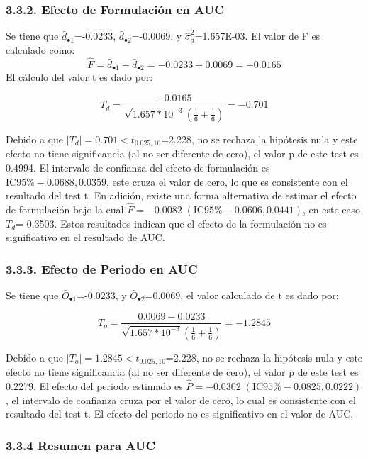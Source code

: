 \documentclass[]{article}
\begin{document}
\subsubsection{3.3.2. Efecto de Formulación en
AUC}\label{efecto-de-formulacion-en-auc}

Se tiene que \(\bar{d}_{\bullet1}\)=-0.0233,
\(\bar{d}_{\bullet2}\)=-0.0069, y \(\hat{\sigma}_{d}^{2}\)=1.657E-03. El
valor de F es calculado como:
\[\hat{F} = \bar{d}_{\bullet1} - \bar{d}_{\bullet2} = -0.0233 + 0.0069 = -0.0165\]
El cálculo del valor t es dado por:

\[T_{d}=\frac{-0.0165}{\sqrt{1.657*10^{-3}}\left(\frac{1}{6}+\frac{1}{6}\right)}=-0.701\]

Debido a que \(\left|T_{d}\right|=0.701<t_{0.025,10}\)=2.228, no se
rechaza la hipótesis nula y este efecto no tiene significancia (al no
ser diferente de cero), el valor p de este test es 0.4994. El intervalo
de confianza del efecto de formulación es
\(\textrm{IC95}\%-0.0688,0.0359\), este cruza el valor de cero, lo que
es consistente con el resultado del test t. En adición, existe una forma
alternativa de estimar el efecto de formulación bajo la cual
\(\hat{F}=-0.0082\;(\textrm{IC95}\%-0.0606,0.0441)\), en este caso
\(T_{d}\)=-0.3503. Estos resultados indican que el efecto de la
formulación no es significativo en el resultado de AUC.

\subsubsection{3.3.3. Efecto de Periodo en
AUC}\label{efecto-de-periodo-en-auc}

Se tiene que \(\bar{O}_{\bullet1}\)=-0.0233, y
\(\bar{O}_{\bullet2}\)=0.0069, el valor calculado de t es dado por:

\[T_{o}=\frac{0.0069-0.0233}{\sqrt{1.657*10^{-3}}\left(\frac{1}{6}+\frac{1}{6}\right)}=-1.2845\]

Debido a que \(\left|T_{o}\right|=1.2845<t_{0.025,10}\)=2.228, no se
rechaza la hipótesis nula y este efecto no tiene significancia (al no
ser diferente de cero), el valor p de este test es 0.2279. El efecto del
periodo estimado es
\(\hat{P}=-0.0302\;(\textrm{IC95}\%-0.0825,0.0222)\), el intervalo de
confianza cruza por el valor de cero, lo cual es consistente con el
resultado del test t. El efecto del periodo no es significativo en el
valor de AUC.

\subsubsection{3.3.4 Resumen para AUC}\label{resumen-para-auc}
\end{document}
